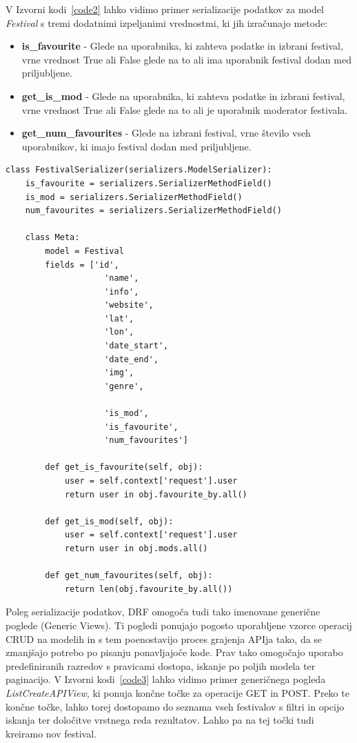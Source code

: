 \documentclass[a4paper,12pt,openright]{book}
\begin{document}
V Izvorni kodi~\ref{code2} lahko vidimo primer serializacije podatkov za model \textit{Festival} s tremi dodatnimi izpeljanimi vrednostmi, ki jih izračunajo metode:
\begin{itemize}
    \item \textbf{is\_favourite} - Glede na uporabnika, ki zahteva podatke in izbrani festival, vrne vrednost True ali False glede na to ali ima uporabnik festival dodan med priljubljene.
    \item \textbf{get\_is\_mod} - Glede na uporabnika, ki zahteva podatke in izbrani festival, vrne vrednost True ali False glede na to ali je uporabnik moderator festivala.
    \item \textbf{get\_num\_favourites} - Glede na izbrani festival, vrne število vseh uporabnikov, ki imajo festival dodan med priljubljene.
\end{itemize}

\begin{lstlisting}[label=code2,caption=Primer serializacije podatkov za model \textit{Festival}.,frame=tb,captionpos=b]
class FestivalSerializer(serializers.ModelSerializer):
    is_favourite = serializers.SerializerMethodField()
    is_mod = serializers.SerializerMethodField()
    num_favourites = serializers.SerializerMethodField()

    class Meta:
        model = Festival
        fields = ['id', 
                    'name', 
                    'info', 
                    'website', 
                    'lat', 
                    'lon',
                    'date_start',
                    'date_end',
                    'img',
                    'genre',
                    
                    'is_mod',
                    'is_favourite',
                    'num_favourites']
        
        def get_is_favourite(self, obj):
            user = self.context['request'].user
            return user in obj.favourite_by.all()
        
        def get_is_mod(self, obj):
            user = self.context['request'].user
            return user in obj.mods.all()
        
        def get_num_favourites(self, obj):
            return len(obj.favourite_by.all())
\end{lstlisting}

Poleg serializacije podatkov, DRF omogoča tudi tako imenovane generične poglede (Generic Views).
Ti pogledi ponujajo pogosto uporabljene vzorce operacij CRUD na modelih in s tem poenostavijo proces grajenja APIja tako, da se zmanjšajo potrebo po pisanju ponavljajoče kode.
Prav tako omogočajo uporabo predefiniranih razredov s pravicami dostopa, iskanje po poljih modela ter paginacijo.
V Izvorni kodi~\ref{code3} lahko vidimo primer generičnega pogleda \textit{ListCreateAPIView}, ki ponuja končne točke za operacije GET in POST.
Preko te končne točke, lahko torej dostopamo do seznama vseh festivalov s filtri in opcijo iskanja ter določitve vrstnega reda rezultatov.
Lahko pa na tej točki tudi kreiramo nov festival.
\end{document}
